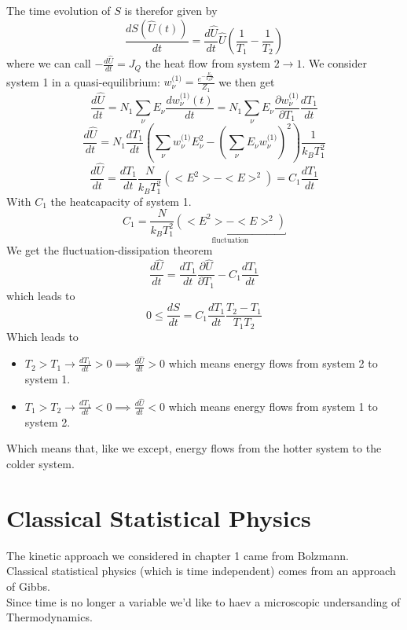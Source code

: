 \documentclass{report}
\begin{document}
The time evolution of $S$ is therefor given by \[
  \frac{dS\left( \hat{U}\left( t \right)  \right) }{dt} = \frac{d\hat{U}}{dt} \hat{U} \left( \frac{1}{T_1} - \frac{1}{T_2} \right)  
\] 
where we can call $-\frac{d\hat{U}}{dt} = J_Q$ the heat flow from system $2 \to 1$.
We consider system 1 in a quasi-equilibrium: $w_\nu^\text{(1)} = \frac{e^{- \frac{E_\nu}{k_B T}}}{Z_1}$ we then get \[
  \frac{d\hat{U}}{dt} = N_1 \sum_{\nu} E_\nu \frac{dw_\nu^\text{(1)}\left( t \right) }{dt} = N_1 \sum_{\nu} E_\nu \frac{\partial w_\nu^\text{(1)} }{\partial T_1 } \frac{dT_1}{dt}  
\] \[
\frac{d\hat{U}}{dt} = N_1 \frac{dT_1}{dt} \left( \sum_{\nu} w_\nu^\text{(1)} E_\nu^2 - \left( \sum_{\nu} E_\nu w_\nu^\text{(1)}  \right) ^2   \right) \frac{1}{k_B T_1^2} 
\] \[
\frac{d\hat{U}}{dt} = \frac{dT_1}{dt} \frac{N}{k_B T_1^2} \left( <E^2> - <E>^2 \right) = C_1 \frac{dT_1}{dt}
\] With $C_1$ the heatcapacity of system 1. \[
C_1 = \frac{N}{k_B T_1^2} \underbracket{\left( <E^2> - <E>^2 \right) }_{\text{fluctuation}}
\] 
We get the fluctuation-dissipation theorem \[
  \frac{d\hat{U}}{dt} = \frac{dT_1}{dt} \frac{\partial \hat{U} }{\partial T_1 } - C_1 \frac{dT_1}{dt}
\] which leads to \[
0\le \frac{dS}{dt} = C_1 \frac{dT_1}{dt} \frac{T_2 - T_1}{T_1T_2}
\] Which leads to
\begin{itemize}
  \item $T_2 > T_1 \to \frac{dT_1}{dt} > 0 \implies \frac{d\hat{U}}{dt}>0$ which means energy flows from system 2 to system 1.
  \item $T_1 > T_2 \to \frac{dT_1}{dt} < 0 \implies \frac{d\hat{U}}{dt}<0$ which means energy flows from system 1 to system 2.
\end{itemize}
Which means that, like we except, energy flows from the hotter system to the colder system.


\chapter{Classical Statistical Physics}
The kinetic approach we considered in chapter 1 came from Bolzmann.\\
Classical statistical physics (which is time independent) comes from an approach of Gibbs.\\
Since time is no longer a variable we'd like to haev a microscopic undersanding of Thermodynamics.
\end{document}

